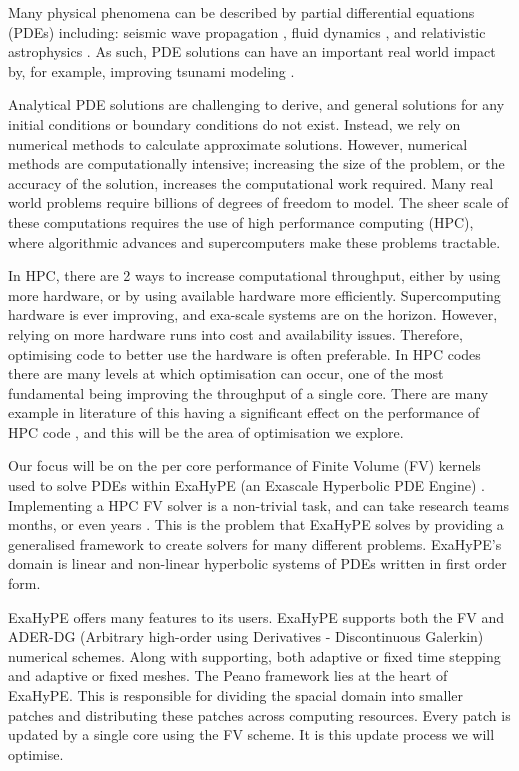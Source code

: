 Many physical phenomena can be described by partial differential equations (PDEs) including:  seismic wave propagation \cite{earthquakePDE}, fluid dynamics \cite{exahype}, and relativistic astrophysics \cite{relativisticPDE}.
As such, PDE solutions can have an important real world impact by, for example, improving tsunami modeling \cite{tsunamiPDE}.


Analytical PDE solutions are challenging to derive, and general solutions for any initial conditions or boundary conditions do not exist.
Instead, we rely on numerical methods to calculate approximate solutions.
However, numerical methods are computationally intensive; increasing the size of the problem, or the accuracy of the solution, increases the computational work required.
Many real world problems require billions of degrees of freedom to model.
The sheer scale of these computations requires the use of high performance computing (HPC), where algorithmic advances and supercomputers make these problems tractable.

In HPC, there are 2 ways to increase computational throughput, either by using more hardware, or by using available hardware more efficiently.
Supercomputing hardware is ever improving, and exa-scale systems are on the horizon.
However, relying on more hardware runs into cost and availability issues.
Therefore, optimising code to better use the hardware is often preferable.
In HPC codes there are many levels at which optimisation can occur, one of the most fundamental being improving the throughput of a single core.
There are many example in literature of this having a significant effect on the performance of HPC code \cite{YATeTo,seisolPFLOP,codegen_dg_SIMD}, and this will be the area of optimisation we explore.     

Our focus will be on the per core performance of Finite Volume (FV) kernels used to solve PDEs within ExaHyPE (an Exascale Hyperbolic PDE Engine) \cite{exahype}.
Implementing a HPC FV solver is a non-trivial task, and can take research teams months, or even years \cite{tensorChemistry}.
This is the problem that ExaHyPE solves by providing a generalised framework to create solvers for many different problems.
ExaHyPE's domain is linear and non-linear hyperbolic systems of PDEs written in first order form.

ExaHyPE offers many features to its users.
ExaHyPE supports both the FV and ADER-DG (Arbitrary high-order using Derivatives - Discontinuous Galerkin) numerical schemes.
Along with supporting, both adaptive or fixed time stepping and adaptive or fixed meshes.
The Peano framework \cite{PeanoFramework} lies at the heart of ExaHyPE.
This is responsible for dividing the spacial domain into smaller patches and distributing these patches across computing resources.
Every patch is updated by a single core using the FV scheme.
It is this update process we will optimise.

